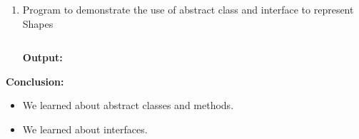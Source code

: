 \documentclass{book}
\begin{document}
{\begin{enumerate}
            
        \item{Program to demonstrate the use of abstract class and interface to represent Shapes}
            \par
            \inputminted{java}{homework/BankingSystem.java}
            \par
            \textbf{Output:}
            
    \end{enumerate}
    \par
    \textbf{Conclusion:}
    \begin{itemize}
        \item{We learned about abstract classes and methods.}
        \item{We learned about interfaces.}
    \end{itemize}
}
\end{document}

